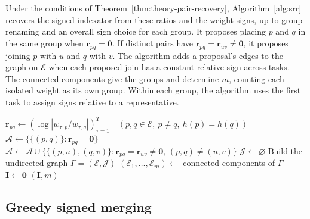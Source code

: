 Under the conditions of Theorem~\ref{thm:theory-pair-recovery},
Algorithm~\ref{alg:srr} recovers the signed indexator from these
ratios and the weight signs, up to group renaming and an overall sign
choice for each group. It proposes placing $p$ and $q$ in the same
group when $\mathbf r_{pq}=\mathbf0$. If distinct pairs have
$\mathbf r_{pq}=\mathbf r_{uv}\ne\mathbf0$, it proposes joining $p$
with $u$ and $q$ with $v$. The algorithm adds a proposal's edges to
the graph on $\mathcal E$ when each proposed join has a constant
relative sign across tasks. The connected components give the groups
and determine $m$, counting each isolated weight as its own group.
Within each group, the algorithm uses the first task to assign signs
relative to a representative.

\begin{algorithm}[H]
    \small
    \DontPrintSemicolon
    \SetAlgoNoEnd
    \caption{Sign--Ratio Recovery (SRR)}
    \label{alg:srr}
    $\mathbf r_{pq}\gets(\log|w_{\tau,p}/w_{\tau,q}|)_{\tau=1}^T
        \quad(p,q\in\mathcal E,\ p\ne q,\ h(p)=h(q))$\;
    $\mathcal A\gets\bigl\{\{(p,q)\}:\mathbf r_{pq}=\mathbf0\bigr\}$\;
    $\mathcal A\gets\mathcal A\cup
        \bigl\{\{(p,u),(q,v)\}:\mathbf r_{pq}=\mathbf r_{uv}\ne\mathbf0,\,
        (p,q)\ne(u,v)\bigr\}$\;
    $\mathcal J\gets\varnothing$\;
    Build the undirected graph $\Gamma=(\mathcal E,\mathcal J)$\;
    $(\mathcal E_1,\ldots,\mathcal E_m)\gets$ connected components of $\Gamma$\;
    $\mathbf I\gets\mathbf0$ 
    \Return $(\mathbf I,m)$\;
\end{algorithm}

\subsection{Greedy signed merging}
\label{sec:method-signed-merge}

